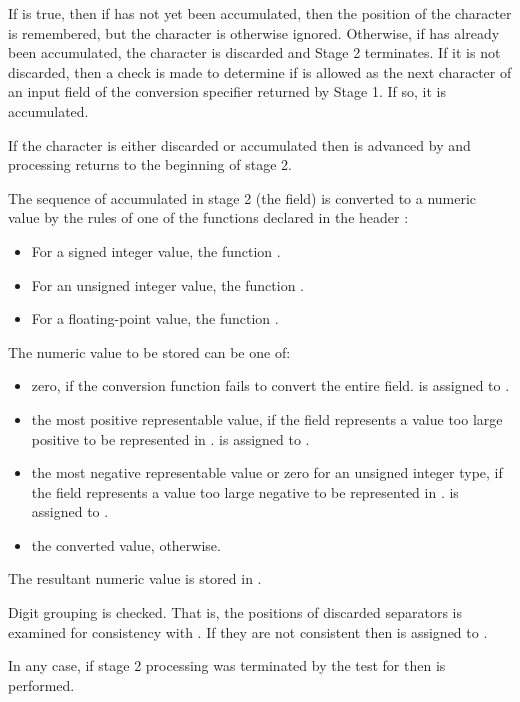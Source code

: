 \begin{itemdescr}
\begin{description}
If  is true, then if
has not yet been accumulated, then the position of the character is remembered,
but the character is otherwise ignored.
Otherwise, if
has already been accumulated, the character is discarded and
Stage 2 terminates.
If it is not discarded, then a check is made to determine if  is
allowed as the next character of an input field of the conversion specifier
returned by Stage 1. If so, it is accumulated.

If the character is either discarded or accumulated then 
is advanced by
and processing returns to the beginning of stage 2.

The sequence of  accumulated in stage 2 (the field) is converted to a numeric value by the rules of one of the functions declared in the header :

\begin{itemize}
\item For a signed integer value, the function .

\item For an unsigned integer value, the function .

\item For a floating-point value, the function .
\end{itemize}

The numeric value to be stored can be one of:

\begin{itemize}
\item zero, if the conversion function fails to convert the entire field.  is assigned to .

\item the most positive representable value, if the field represents a value too large positive to be represented in .  is assigned to .

\item the most negative representable value or zero for an unsigned integer type, if the field represents a value too large negative to be represented in .  is assigned to .

\item the converted value, otherwise.
\end{itemize}

The resultant numeric value is stored in .

\end{description}

\pnum
Digit grouping is checked.
That is, the positions of discarded
separators is examined for consistency with
.
If they are not consistent then
is assigned to .

\pnum
In any case, if stage 2 processing was terminated by the test for
then
is performed.
\end{itemdescr}

